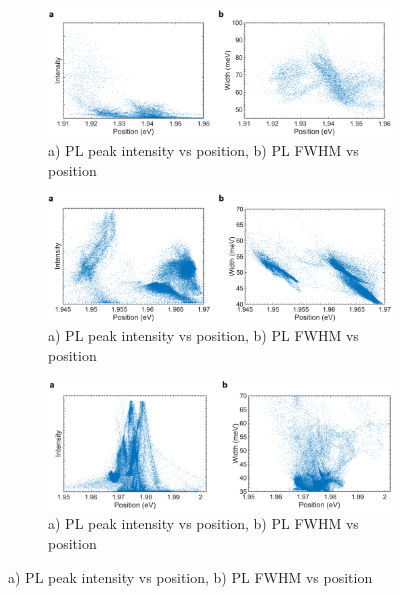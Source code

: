 \begin{figure}[!h]
	\begin{center}
		\begin{subfigure}[b]{0.8\textwidth}
			\includegraphics[scale=0.3]{PaperSIScatterWO3.png}
			\caption{a) PL peak intensity vs position, b) PL FWHM vs position}
			\label{fig:PaperSIScatterWO3}
		\end{subfigure}

		\begin{subfigure}[b]{0.8\textwidth}
			\includegraphics[scale=0.3]{PaperSIScatterWO3NaCl.png}
			\caption{a) PL peak intensity vs position, b) PL FWHM vs position}
			\label{fig:PaperSIScatterWO3NaCl}
		\end{subfigure}

		\begin{subfigure}[b]{0.8\textwidth}
			\includegraphics[scale=0.3]{PaperSIScatterH2WO4NaCl.png}
			\caption{a) PL peak intensity vs position, b) PL FWHM vs position}
			\label{fig:PaperSIScatterH2WO4NaCl}
		\end{subfigure}


\end{center}
\end{figure}
